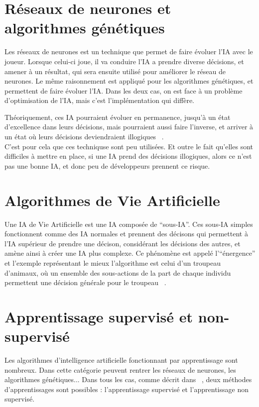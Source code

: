 \documentclass[asi]{picINSA}
\begin{document}
\section{Réseaux de neurones et algorithmes génétiques}
Les réseaux de neurones est un technique que permet de faire évoluer l'IA avec le joueur. Lorsque celui-ci joue, il va conduire l'IA a prendre diverse décisions, et amener à un résultat, qui sera ensuite utilisé pour améliorer le réseau de neurones. Le même raisonnement est appliqué pour les algorithmes génétiques, et permettent de faire évoluer l'IA. Dans les deux cas, on est face à un problème d'optimisation de l'IA, mais c'est l'implémentation qui diffère.

Théoriquement, ces IA pourraient évoluer en permanence, jusqu'à un état d'excellence dans leurs décisions, mais pourraient aussi faire l'inverse, et arriver à un état où leurs décisions deviendraient illogiques ~\cite{CompGamesWithIntel}.\\
C'est pour cela que ces techniquse sont peu utilisées. Et outre le fait qu'elles sont difficiles à mettre en place, si une IA prend des décisions illogiques, alors ce n'est pas une bonne IA, et donc peu de développeurs prennent ce risque.\\

\section{Algorithmes de Vie Artificielle}
Une IA de Vie Artificielle est une IA composée de ``sous-IA''. Ces sous-IA simples fonctionnent comme des IA normales et prennent des décisons qui permettent à l'IA supérieur de prendre une décison, considérant les décisions des autres, et amène ainsi à créer une IA plus complexe.
Ce phénomène est appelé l'``énergence'' et l'exemple représentant le mieux l'algorithme est celui d'un troupeau d'animaux, où un ensemble des sous-actions de la part de chaque individu permettent une décision générale pour le troupeau ~\cite{CompGamesWithIntel}.

\section{Apprentissage supervisé et non-supervisé}
Les algorithmes d’intelligence artificielle fonctionnant par apprentissage sont nombreux. Dans cette catégorie peuvent rentrer les réseaux de neurones, les algorithmes génétiques... Dans tous les cas, comme décrit dans ~\cite{tambellinicomment}, deux méthodes d’apprentissages sont possibles : l’apprentissage supervisé et l’apprentissage non supervisé.
\end{document}
